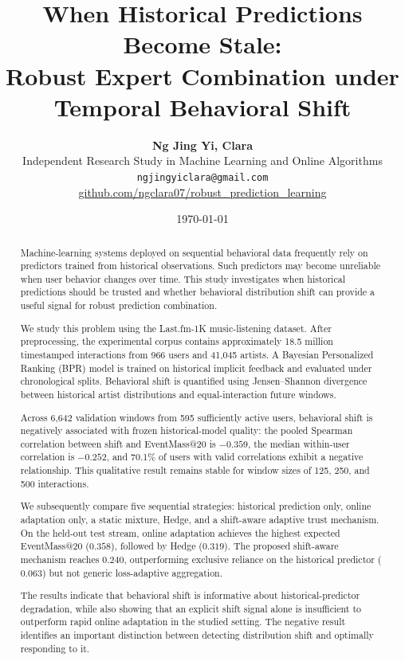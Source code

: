 \documentclass[11pt]{article}
\title{
When Historical Predictions Become Stale:\\
Robust Expert Combination under Temporal Behavioral Shift
}
\author{
\textbf{Ng Jing Yi, Clara}\\
Independent Research Study in Machine Learning and Online Algorithms\\
\texttt{ngjingyiclara@gmail.com}\\
\href{https://github.com/ngclara07/robust_prediction_learning}
{github.com/ngclara07/robust\_prediction\_learning}
}
\date{\today}
\begin{document}
\maketitle


\begin{abstract}

Machine-learning systems deployed on sequential behavioral data
frequently rely on predictors trained from historical observations.
Such predictors may become unreliable when user behavior changes over
time. This study investigates when historical predictions should be
trusted and whether behavioral distribution shift can provide a useful
signal for robust prediction combination.

We study this problem using the Last.fm-1K music-listening dataset.
After preprocessing, the experimental corpus contains approximately
18.5 million timestamped interactions from 966 users and 41,045
artists. A Bayesian Personalized Ranking (BPR) model is trained on
historical implicit feedback and evaluated under chronological splits.
Behavioral shift is quantified using Jensen--Shannon divergence between
historical artist distributions and equal-interaction future windows.

Across 6,642 validation windows from 595 sufficiently active users,
behavioral shift is negatively associated with frozen historical-model
quality: the pooled Spearman correlation between shift and
EventMass@20 is $-0.359$, the median within-user correlation is
$-0.252$, and 70.1\% of users with valid correlations exhibit a
negative relationship. This qualitative result remains stable for
window sizes of 125, 250, and 500 interactions.

We subsequently compare five sequential strategies: historical
prediction only, online adaptation only, a static mixture, Hedge, and a
shift-aware adaptive trust mechanism. On the held-out test stream,
online adaptation achieves the highest expected EventMass@20
($0.358$), followed by Hedge ($0.319$). The proposed shift-aware
mechanism reaches $0.240$, outperforming exclusive reliance on the
historical predictor ($0.063$) but not generic loss-adaptive
aggregation.

The results indicate that behavioral shift is informative about
historical-predictor degradation, while also showing that an explicit
shift signal alone is insufficient to outperform rapid online
adaptation in the studied setting. The negative result identifies an
important distinction between detecting distribution shift and
optimally responding to it.

\end{abstract}
\end{document}
